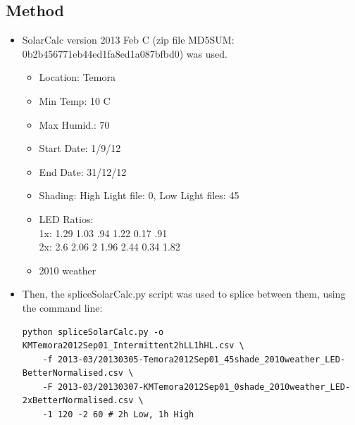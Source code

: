 \documentclass[12pt,a4paper]{book}
\begin{document}
    \subsection*{Method}
      \begin{itemize} \itemsep1pt \parskip0pt 
        \item SolarCalc version 2013 Feb C (zip file MD5SUM: 0b2b456771eb44ed1fa8ed1a087bfbd0) was
          used.
        \begin{itemize} \itemsep1pt \parskip0pt 
          \item Location: Temora
          \item Min Temp: 10 C
          \item Max Humid.: 70
          \item Start Date: 1/9/12
          \item End Date: 31/12/12
          \item Shading: High Light file: 0, Low Light files: 45
          \item LED Ratios: \\
            1x: 1.29 1.03 .94 1.22 0.17 .91\\
            2x: 2.6 2.06 2 1.96 2.44 0.34 1.82
          \item 2010 weather
        \end{itemize}
        \item Then, the spliceSolarCalc.py script was used to splice between them, using the command
          line: \\
          \footnotesize\begin{verbatim}
python spliceSolarCalc.py -o KMTemora2012Sep01_Intermittent2hLL1hHL.csv \
    -f 2013-03/20130305-Temora2012Sep01_45shade_2010weather_LED-BetterNormalised.csv \
    -F 2013-03/20130307-KMTemora2012Sep01_0shade_2010weather_LED-2xBetterNormalised.csv \
    -1 120 -2 60 # 2h Low, 1h High
          \end{verbatim}
      \end{itemize}
\end{document}
